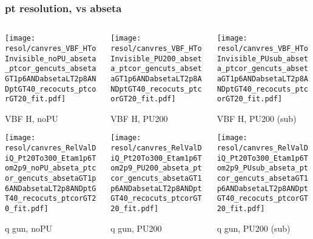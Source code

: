 \documentclass[8pt]{beamer}
\begin{document}
  \begin{frame}
  \frametitle{pt resolution, vs abseta}
  
  \begin{columns}
   \begin{column}{0.35\textwidth}
     \texttt{[image: resol/canvres\_VBF\_HToInvisible\_noPU\_abseta\_ptcor\_gencuts\_absetaGT1p6ANDabsetaLT2p8ANDptGT40\_recocuts\_ptcorGT20\_fit.pdf]}
     
     VBF H, noPU
    
     \texttt{[image: resol/canvres\_RelValDiQ\_Pt20To300\_Etam1p6Tom2p9\_noPU\_abseta\_ptcor\_gencuts\_absetaGT1p6ANDabsetaLT2p8ANDptGT40\_recocuts\_ptcorGT20\_fit.pdf]}
     
     q gun, noPU
   \end{column}
   \begin{column}{0.35\textwidth}
     \texttt{[image: resol/canvres\_VBF\_HToInvisible\_PU200\_abseta\_ptcor\_gencuts\_absetaGT1p6ANDabsetaLT2p8ANDptGT40\_recocuts\_ptcorGT20\_fit.pdf]}
     
     VBF H, PU200
    
     \texttt{[image: resol/canvres\_RelValDiQ\_Pt20To300\_Etam1p6Tom2p9\_PU200\_abseta\_ptcor\_gencuts\_absetaGT1p6ANDabsetaLT2p8ANDptGT40\_recocuts\_ptcorGT20\_fit.pdf]}
     
     q gun, PU200
   \end{column}
   \begin{column}{0.35\textwidth}
     \texttt{[image: resol/canvres\_VBF\_HToInvisible\_PUsub\_abseta\_ptcor\_gencuts\_absetaGT1p6ANDabsetaLT2p8ANDptGT40\_recocuts\_ptcorGT20\_fit.pdf]}
     
     VBF H, PU200 (sub)
    
     \texttt{[image: resol/canvres\_RelValDiQ\_Pt20To300\_Etam1p6Tom2p9\_PUsub\_abseta\_ptcor\_gencuts\_absetaGT1p6ANDabsetaLT2p8ANDptGT40\_recocuts\_ptcorGT20\_fit.pdf]}
     
     q gun, PU200 (sub)
   \end{column}
  \end{columns}
 \end{frame}
 
\end{document}
